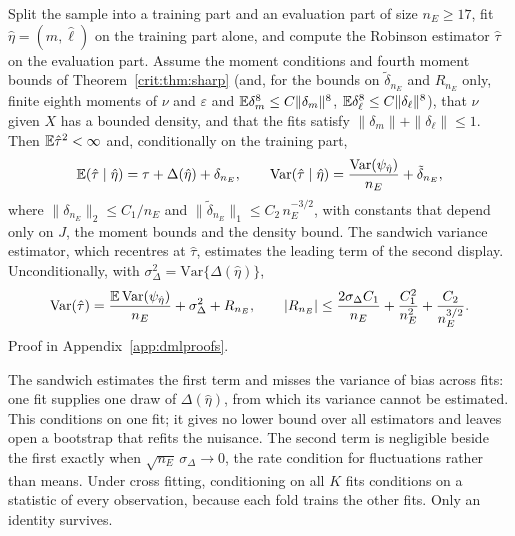 \begin{theorem}\label{crit:thm:single}
Split the sample into a training part and an evaluation part of size $n_E \ge 17$, fit $\hat\eta = (\hat m, \hat\ell)$ on the training part alone, and compute the Robinson estimator $\hat\tau$ on the evaluation part. Assume the moment conditions and fourth moment bounds of Theorem~\ref{crit:thm:sharp} (and, for the bounds on $\tilde\delta_{n_E}$ and $R_{n_E}$ only, finite eighth moments of $\nu$ and $\varepsilon$ and $\mathbb{E}\delta_m^8 \le C\|\delta_m\|^8$, $\mathbb{E}\delta_\ell^8 \le C\|\delta_\ell\|^8$), that $\nu$ given $X$ has a bounded density, and that the fits satisfy $\|\delta_m\| + \|\delta_\ell\| \le 1$. Then $\mathbb{E}\hat\tau^2 < \infty$ and, conditionally on the training part,
\[
\mathbb{E}(\hat\tau \mid \hat\eta) = \tau + \Delta(\hat\eta) + \delta_{n_E}, \qquad \mathrm{Var}(\hat\tau \mid \hat\eta) = \frac{\mathrm{Var}(\psi_{\hat\eta})}{n_E} + \tilde\delta_{n_E},
\]
where $\|\delta_{n_E}\|_2 \le C_1/n_E$ and $\|\tilde\delta_{n_E}\|_1 \le C_2\,n_E^{-3/2}$, with constants that depend only on $J$, the moment bounds and the density bound. The sandwich variance estimator, which recentres at $\hat\tau$, estimates the leading term of the second display. Unconditionally, with $\sigma_\Delta^2 = \mathrm{Var}\{\Delta(\hat\eta)\}$,
\[
\mathrm{Var}(\hat\tau) = \frac{\mathbb{E}\,\mathrm{Var}(\psi_{\hat\eta})}{n_E} + \sigma_\Delta^2 + R_{n_E}, \qquad |R_{n_E}| \le \frac{2\sigma_\Delta C_1}{n_E} + \frac{C_1^2}{n_E^2} + \frac{C_2}{n_E^{3/2}}.
\]
Proof in Appendix~\ref{app:dmlproofs}.
\end{theorem}

The sandwich estimates the first term and misses the variance of bias across fits: one fit supplies one draw of $\Delta(\hat\eta)$, from which its variance cannot be estimated. This conditions on one fit; it gives no lower bound over all estimators and leaves open a bootstrap that refits the nuisance. The second term is negligible beside the first exactly when $\sqrt{n_E}\,\sigma_\Delta \to 0$, the rate condition for fluctuations rather than means. Under cross fitting, conditioning on all $K$ fits conditions on a statistic of every observation, because each fold trains the other fits. Only an identity survives.

